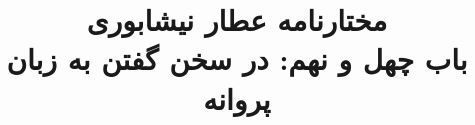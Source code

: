 \documentclass[14pt,b5paper]{article}
\begin{document}
\title{\Huge مختارنامه عطار نیشابوری \\
باب چهل و نهم: در سخن گفتن به زبان پروانه}
\author{ }
\date{ }
\maketitle
\newpage
\tableofcontents
\newpage

\newpage

\newpage

\newpage

\newpage

\newpage

\newpage

\newpage

\newpage

\newpage

\newpage

\newpage

\newpage

\newpage

\newpage

\newpage

\newpage

\newpage

\newpage
\end{document}
